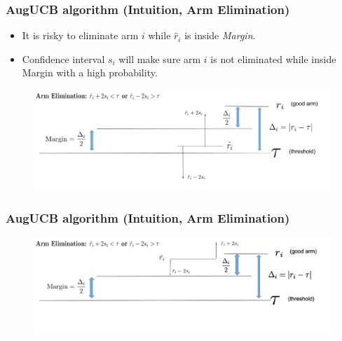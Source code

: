 \begin{frame}
\frametitle{AugUCB algorithm (Intuition, Arm Elimination)}
\begin{itemize}
\item It is risky to eliminate arm $i$ while $\hat{r}_i$ is inside \emph{Margin}. 
\item Confidence interval $s_i$ will make sure arm $i$ is not eliminated while inside Margin with a high probability. 
\end{itemize}

\begin{figure}
\includegraphics[scale=0.278]{img/ArmElim1.png}
\end{figure}
\end{frame}

\begin{frame}
\frametitle{AugUCB algorithm (Intuition, Arm Elimination)}
\begin{figure}
\includegraphics[scale=0.278]{img/ArmElim2.png}
\end{figure}
\end{frame}



